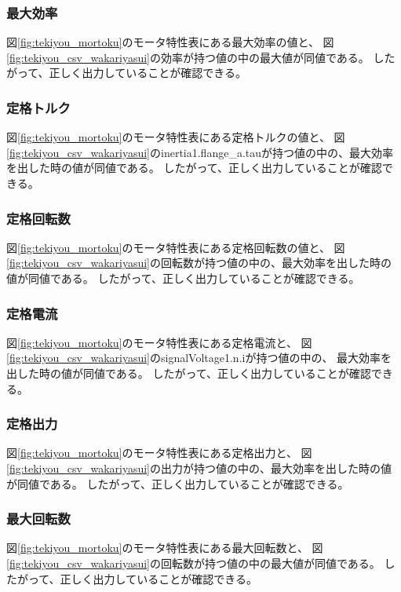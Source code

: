 \subsubsection{最大効率}
図\ref{fig:tekiyou_mortoku}のモータ特性表にある最大効率の値と、
図\ref{fig:tekiyou_csv_wakariyasui}の効率が持つ値の中の最大値が同値である。
したがって、正しく出力していることが確認できる。

\subsubsection{定格トルク}
図\ref{fig:tekiyou_mortoku}のモータ特性表にある定格トルクの値と、
図\ref{fig:tekiyou_csv_wakariyasui}のinertia1.flange\_a.tauが持つ値の中の、最大効率を出した時の値が同値である。
したがって、正しく出力していることが確認できる。

\subsubsection{定格回転数}
図\ref{fig:tekiyou_mortoku}のモータ特性表にある定格回転数の値と、
図\ref{fig:tekiyou_csv_wakariyasui}の回転数が持つ値の中の、最大効率を出した時の値が同値である。
したがって、正しく出力していることが確認できる。

\subsubsection{定格電流}
図\ref{fig:tekiyou_mortoku}のモータ特性表にある定格電流と、
図\ref{fig:tekiyou_csv_wakariyasui}のsignalVoltage1.n.iが持つ値の中の、
最大効率を出した時の値が同値である。
したがって、正しく出力していることが確認できる。

\subsubsection{定格出力}
図\ref{fig:tekiyou_mortoku}のモータ特性表にある定格出力と、
図\ref{fig:tekiyou_csv_wakariyasui}の出力が持つ値の中の、最大効率を出した時の値が同値である。
したがって、正しく出力していることが確認できる。

\subsubsection{最大回転数}
図\ref{fig:tekiyou_mortoku}のモータ特性表にある最大回転数と、
図\ref{fig:tekiyou_csv_wakariyasui}の回転数が持つ値の中の最大値が同値である。
したがって、正しく出力していることが確認できる。

